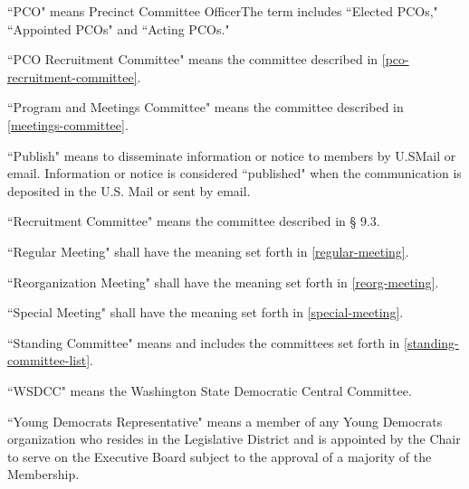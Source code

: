 \begin{alphalist}
    \item ``PCO" means Precinct Committee OfficerThe term includes ``Elected PCOs," ``Appointed PCOs" and ``Acting PCOs."
    \item ``PCO Recruitment Committee" means the committee described in \autoref{pco-recruitment-committee}.
    \item ``Program and Meetings Committee" means the committee described in \autoref{meetings-committee}.
    \item ``Publish" means to disseminate information or notice to members by U.SMail or email.  Information or notice is considered ``published" when the communication is deposited in the U.S. Mail or sent by email.
    \item ``Recruitment Committee" means the committee described in § 9.3.
    \item ``Regular Meeting" shall have the meaning set forth in \autoref{regular-meeting}.
    \item ``Reorganization Meeting" shall have the meaning set forth in \autoref{reorg-meeting}.
    \item ``Special Meeting" shall have the meaning set forth in \autoref{special-meeting}.
    \item ``Standing Committee" means and includes the committees set forth in \autoref{standing-committee-list}.
    \item ``WSDCC" means the Washington State Democratic Central Committee.
    \item ``Young Democrats Representative" means a member of any Young Democrats organization who resides in the Legislative District and is appointed by the Chair to serve on the Executive Board subject to the approval of a majority of the Membership.
\end{alphalist}

